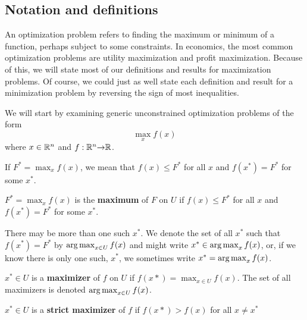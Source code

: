 \subsection{Notation and definitions}
An optimization problem refers to finding the maximum or minimum of a
function, perhaps subject to some constraints. In economics, the most
common optimization problems are utility maximization and profit
maximization. Because of this, we will state most of our definitions
and results for maximization problems. Of course, we could just as
well state each definition and result for a minimization problem by
reversing the sign of most inequalities.

We will start by examining generic unconstrained optimization problems
of the form
\[ \max_{x} f(x) \] 
where $x \in \mathbb{R}^n$ and $f:\mathbb{R}^n {\rightarrow} \mathbb{R}$.

If $F^* = \max_{x} f(x)$, we mean that $f(x) \leq F^*$ for all $x$ and
$f(x^*) = F^*$ for some $x^*$.
\begin{definition}\label{d:max}
  $F^* = \max_{x} f(x)$ is the \textbf{maximum} of $F$ on $U$ if
  $f(x) \leq F^*$ for all $x$ and $f(x^*) = F^*$ for some $x^*$.
\end{definition}
There may be more than one such $x^*$. We denote the set of all $x^*$
such that $f(x^*) = F^*$ by $\argmax_{x \in U} f(x)$ and might write
$x^* \in \argmax_{x} f(x)$, or, if we know there is only one
such, $x^*$, we sometimes write $x^* = \argmax_{x} f(x)$.
\begin{definition} \label{d:maxer}
  $x^* \in U$ is a \textbf{maximizer} of $f$ on $U$ if $f(x*)
  = \max_{x \in U} 
  f(x)$. The set of all maximizers is denoted $\argmax_{x \in U}
  f(x)$.
\end{definition}
\begin{definition}\label{d:smaxer}
  $x^* \in U$ is a \textbf{strict maximizer} of $f$ if $f(x*) > f(x)
  $ for all $x \neq x^*$
\end{definition}

